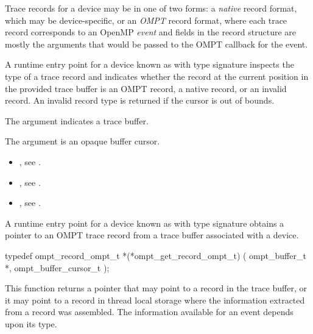 \descr

Trace records for a device may be in one of two forms: a
\emph{native} record format, which may be device-specific,
or an \emph{OMPT} record format, where each trace record
corresponds to an OpenMP \emph{event} and fields in the record
structure are mostly the arguments that would be passed to the
OMPT callback for the event.

A runtime entry point for a device known as
 with type signature
 inspects the type
of a trace record and indicates whether the record at the current
position in the provided trace buffer is an OMPT record,
a native record, or an invalid record. An invalid record type
is returned if the cursor is out of bounds.

\argdesc
The argument  indicates a trace buffer.

The argument  is an opaque buffer cursor.




\crossreferences
\begin{itemize}
\item {},
see .
\item {},
see .
\item {},
see .
\end{itemize}

\label{sec:ompt_get_record_ompt_t}

\summary
A runtime entry point for a device known as 
with type signature 
obtains a pointer to an OMPT trace record from a trace buffer associated with a device.

\format
\begin{ccppspecific}
\begin{omptInquiry}
typedef ompt_record_ompt_t *(*ompt_get_record_ompt_t) (
  ompt_buffer_t *,
  ompt_buffer_cursor_t 
);
\end{omptInquiry}
\end{ccppspecific}

\descr

This function returns a pointer that may point to a record in the
trace buffer, or it may point to a record in thread local storage
where the information extracted from a record was assembled. The
information available for an event depends upon its type.

